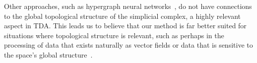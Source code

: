 Other approaches, such as hypergraph neural networks~\cite{feng2018hypergraphs}, do not have connections to the global topological structure of the simplicial complex, a highly relevant aspect in TDA. 
This leads us to believe that our method is far better suited for situations where topological structure is relevant, such as perhaps in the processing of data that exists naturally as vector fields or data that is sensitive to the space's global structure~\cite{deepsphere}.
